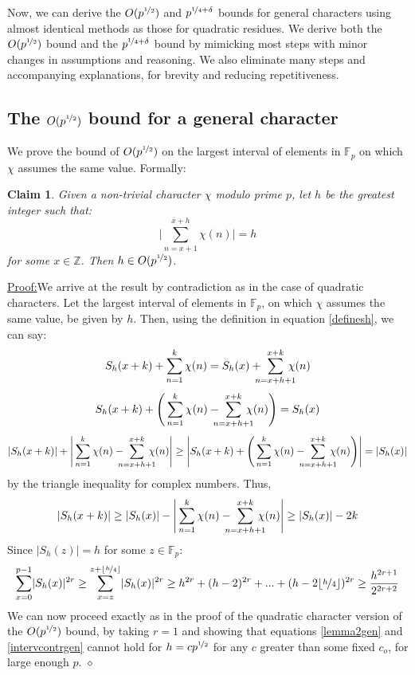 \documentclass{report}
\newtheorem*{claim*}{Claim}
\newenvironment{claimproof}[1]{\vspace{2.5mm}\par\noindent\underline{Proof:}\space#1}{\hfill $\diamond$ \vspace{2.5mm} \par}
\begin{document}
Now, we can derive the $O(p^{\nicefrac{1}{2}})$ and $p^{\nicefrac{1}{4}+\delta}$ bounds for general characters using almost identical methods as those for quadratic residues. We derive both the $O(p^{\nicefrac{1}{2}})$ bound and the $p^{\nicefrac{1}{4}+\delta}$ bound by mimicking most steps with minor changes in assumptions and reasoning. We also eliminate many steps and accompanying explanations, for brevity and reducing repetitiveness.
\subsection{The $O(p^{\nicefrac{1}{2}})$ bound for a general character}
We prove the bound of $O(p^{\nicefrac{1}{2}})$ on the largest interval of elements in $\mathbb{F}_p$ on which $\chi$ assumes the same value. Formally:
\begin{claim*}
Given a non-trivial character $\chi$ modulo prime $p$, let $h$ be the greatest integer such that:
\[\bigg\lvert\sum\limits_{n=x+1}^{x+h}\chi(n)\bigg\rvert=h\]
 for some $x\in\mathbb{Z}$. Then $h\in O(p^{\nicefrac{1}{2}})$.
\end{claim*}
\begin{claimproof}
We arrive at the result by contradiction as in the case of quadratic characters. Let the largest interval of elements in $\mathbb{F}_p$, on which $\chi$ assumes the same value, be given by $h$. Then, using the definition in equation \ref{definesh}, we can say:
\[ S_h(x+k) + \sum\limits_{n=1}^k \chi(n)= S_h(x) +\  \sum\limits_{\mathclap{n=x+h+1}}^{x+k}\:\chi(n)\]
\[ S_h(x+k) + \Bigg(\sum\limits_{n=1}^k \chi(n) -\  \sum\limits_{\mathclap{n=x+h+1}}^{x+k}\:\chi(n) \Bigg) = S_h(x)\]
\[ \lvert S_h(x+k) \rvert + \Bigg\lvert\sum\limits_{n=1}^k \chi(n) -\  \sum\limits_ {\mathclap {n=x+h+1}}^{x+k} \:\chi(n) \Bigg\rvert \geq  \Bigg\lvert S_h(x+k) + \Bigg(\sum\limits_{n=1}^k \chi(n) -\  \sum\limits_ {\mathclap {n=x+h+1}}^{x+k} \:\chi(n) \Bigg) \Bigg\rvert= \lvert S_h(x)\rvert \]
by the triangle inequality for complex numbers. Thus,
\[ \lvert S_h(x+k)\rvert \geq  \lvert S_h(x)\rvert - \Bigg\lvert\sum\limits_{n=1}^k \chi(n) -\  \sum\limits_ {\mathclap {n=x+h+1}}^{x+k} \:\chi(n) \Bigg\rvert \geq \lvert S_h(x)\rvert-2k\]
Since $\lvert S_h(z)\rvert=h$ for some $z\in\mathbb{F}_p$:
\begin{equation} \label{intervcontrgen}
\sum\limits_{x=0}^{p-1}\lvert S_h(x)\rvert^{2r}\geq\sum\limits_{x=z}^{z+\lfloor\nicefrac{h}{4}\rfloor}\lvert S_h(x)\rvert^{2r} \geq h^{2r}+(h-2)^{2r}+...+(h-2\lfloor\nicefrac{h}{4}\rfloor)^{2r} \geq \frac{h^{2r+1}}{2^{2r+2}}
\end{equation}
We can now proceed exactly as in the proof of the quadratic character version of the $O(p^ {\nicefrac{1}{2}})$ bound, by taking $r=1$ and showing that equations \ref{lemma2gen} and \ref{intervcontrgen} cannot hold for $h=cp ^{\nicefrac {1}{2}}$ for any $c$ greater than some fixed $c_o$, for large enough $p$.
\end{claimproof}
\end{document}
